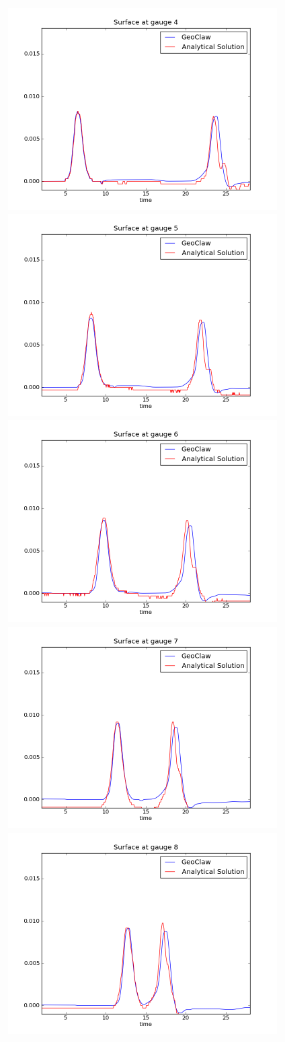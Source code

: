 \begin{figure}[ht]
\hfil\includegraphics[width=2.8in]{bp2/CaseA/gauge0004fig300.png}\hfil
\hfil\includegraphics[width=2.8in]{bp2/CaseA/gauge0005fig300.png}\hfil
\vskip 5pt
\hfil\includegraphics[width=2.8in]{bp2/CaseA/gauge0006fig300.png}\hfil
\hfil\includegraphics[width=2.8in]{bp2/CaseA/gauge0007fig300.png}\hfil
\vskip 5pt
\hfil\includegraphics[width=2.8in]{bp2/CaseA/gauge0008fig300.png}\hfil

\end{figure}
